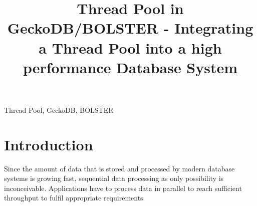 \documentclass[conference]{IEEEtran}
\begin{document}
\title{Thread Pool in GeckoDB/BOLSTER - Integrating a Thread Pool into a high performance Database System \\
}

\author{
	 \and

	 \and

	 \and

}


\maketitle

\begin{abstract}

\end{abstract}

\begin{IEEEkeywords}
Thread Pool, GeckoDB, BOLSTER
\end{IEEEkeywords}

\section{Introduction}
Since the amount of data that is stored and processed by modern database systems is growing fast, sequential data processing as only possibility is inconceivable. Applications have to process data in parallel to reach sufficient throughput to fulfil appropriate requirements. 
\end{document}
